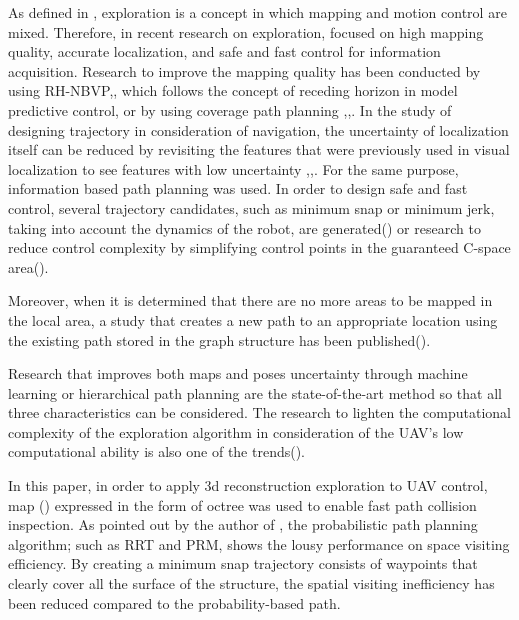 \documentclass[conference,onecolumn]{IEEEtran} %
\begin{document}
As defined in \cite{makarenko2002experiment}, exploration is a concept in which mapping and motion control are mixed. Therefore, in recent research on exploration, focused on high mapping quality, accurate localization, and safe and fast control for information acquisition. Research to improve the mapping quality has been conducted by using RH-NBVP\cite{bircher2016receding},\cite{selin2019efficient}, which follows the concept of receding horizon in model predictive control, or by using coverage path planning \cite{bircher2015structural},\cite{song2018epsilon},\cite{heng2015efficient}. In the study of designing trajectory in consideration of navigation, the uncertainty of localization itself can be reduced by revisiting the features that were previously used in visual localization to see features with low uncertainty \cite{spasojevic2020perception},\cite{dang2018visual},\cite{zhang2018laser}. For the same purpose, information based path planning\cite{dai2020fast} was used. In order to design safe and fast control, several trajectory candidates, such as minimum snap or minimum jerk, taking into account the dynamics of the robot, are generated(\cite{zhang2018p}) or research to reduce control complexity by simplifying control points in the guaranteed C-space area(\cite{tordesillas2020faster}).

Moreover, when it is determined that there are no more areas to be mapped in the local area, a study that creates a new path to an appropriate location using the existing path stored in the graph structure has been published(\cite{witting2018history}).

Research that improves both maps and poses uncertainty through machine learning \cite{popovic2019informative} or hierarchical path planning \cite{papachristos2017uncertainty} are the state-of-the-art method so that all three characteristics can be considered. The research to lighten the computational complexity of the exploration algorithm in consideration of the UAV's low computational ability is also one of the trends(\cite{mcguire2019minimal}).

In this paper, in order to apply 3d reconstruction exploration to UAV control, map (\cite{hornung2013octomap}) expressed in the form of octree was used to enable fast path collision inspection. As pointed out by the author of \cite{gammell2014informed}, the probabilistic path planning algorithm; such as RRT\cite{lavalle1998rapidly} and PRM\cite{geraerts2004comparative}, shows the lousy performance on space visiting efficiency. By creating a minimum snap trajectory consists of waypoints that clearly cover all the surface of the structure, the spatial visiting inefficiency has been reduced compared to the probability-based path.






\end{document}
